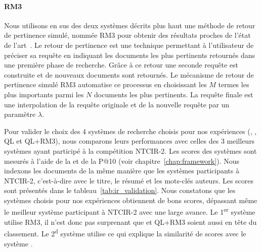 
\paragraph{RM3~\cite{abdul-jaleel_umass_2004}}
Nous utilisons en sus des deux systèmes décrits plus haut une méthode de retour de pertinence simulé, nommée RM3 pour obtenir des résultats proches de l'état de l'art~\cite{lin_neural_2019,yang_critically_2019}.
Le retour de pertinence est une technique permettant à l'utilisateur de préciser sa requête en indiquant les documents les plus pertinents retournés dans une première phase de recherche.
Grâce à ce retour une seconde requête est construite et de nouveaux documents sont retournés.
Le mécanisme de retour de pertinence simulé RM3 automatise ce processus en choisissant les $M$ termes les plus importants parmi les $N$ documents les plus pertinents.
La requête finale est une interpolation de la requête originale et de la nouvelle requête par un paramètre $\lambda$.%



Pour valider le choix des 4 systèmes de recherche choisis pour nos expériences (\bm{}, \bmrm{}, QL et QL+RM3), nous comparons leurs performances avec celles des 3 meilleurs systèmes ayant participé à la compétition NTCIR-2.
Les scores des systèmes sont mesurés à l'aide de la \map{} et de la P@10 (voir chapitre~\ref{chap:framework}).
Nous indexons les documents de la même manière que les systèmes participants à NTCIR-2, c'est-à-dire avec le titre, le résumé et les mots-clés auteurs.
Les scores sont présentés dans le tableau~\ref{tab:ir_validation}.
Nous constatons que les systèmes choisis pour nos expériences obtiennent de bons scores, dépassant même le meilleur système participant à NTCIR-2 avec une large avance.
Le 1\textsuperscript{er} système utilise RM3, il n'est donc pas surprenant que \bmrm{} et QL+RM3 soient aussi en tête du classement.
Le 2\textsuperscript{d} système utilise \bm{} ce qui explique la similarité de scores avec le système \bm{}.


